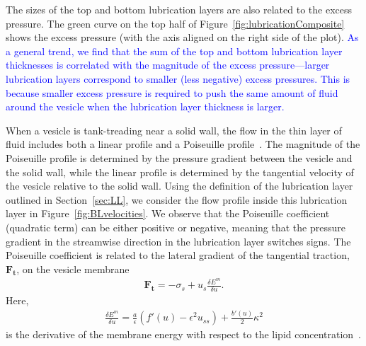 \documentclass[twoside,twocolumn,9pt]{article}
\renewcommand{\tt}{\mathbf{t}}
\begin{document}
The sizes of the top and bottom lubrication layers are also related to
the excess pressure. The green curve on the top half of
Figure~\ref{fig:lubricationComposite} shows the excess pressure (with
the axis aligned on the right side of the plot). 
\textcolor{blue}{
As a general trend, we find that the sum of the top and bottom
lubrication layer thicknesses is correlated with the magnitude of the
excess pressure---larger lubrication layers correspond to smaller (less
negative) excess pressures. This is because smaller excess pressure is
required to push the same amount of fluid around the vesicle when the
lubrication layer thickness is larger.}

When a vesicle is tank-treading near a solid wall, the flow in the thin
layer of fluid includes both a linear profile and a Poiseuille
profile~\cite{mis-wis-ber-key-li-tun-law-per-erd-zha-zha-sun-kal-lam-kon2019}.
The magnitude of the Poiseuille profile is determined by the pressure
gradient between the vesicle and the solid wall, while the linear
profile is determined by the tangential velocity of the vesicle relative
to the solid wall. Using the definition of the lubrication layer
outlined in Section~\ref{sec:LL}, we consider the flow profile inside
this lubrication layer in Figure~\ref{fig:BLvelocities}. We observe that
the Poiseuille coefficient (quadratic term) can be either positive or
negative, meaning that the pressure gradient in the streamwise direction
in the lubrication layer switches signs. The Poiseuille coefficient is
related to the lateral gradient of the tangential traction,
$\mathbf{F}_\tt$, on the vesicle membrane~\cite{Oron1997_RMP,
Young2014_JFM}
\begin{align}
  \mathbf{F}_{\tt} = -\sigma_s + u_s \frac{\delta E^m}{\delta u}.
\end{align}
Here,
\begin{align}
  \frac{\delta E^m}{\delta u} = \frac{a}{\epsilon} 
    (f'(u) - \epsilon^2 u_{ss}) + \frac{b'(u)}{2} \kappa^2
\end{align}
is the derivative of the membrane energy with respect to the lipid
concentration~\cite{soh-tse-li-voi-low2010}. 
\end{document}
